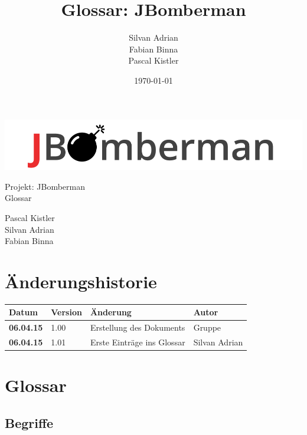 \documentclass[11pt]{scrartcl}
\title{Glossar: JBomberman}
\author{Silvan Adrian \\ Fabian Binna \\ Pascal Kistler}
\date{\today{}}
\begin{document}
\def\arraystretch{1.5}
\begin{titlepage}
\begin{center}
\vspace{10em}
\includegraphics[scale=2]{jbomberman}
\vspace{10em}
\end{center}
\begin{center}
\huge {Projekt: JBomberman} \\
\huge {Glossar}
\end{center}
\begin{center}
\vspace{10em}
\LARGE {Pascal Kistler} \\
\LARGE {Silvan Adrian} \\
\LARGE {Fabian Binna}
\end{center}

\end{titlepage}

\newpage
\section{Änderungshistorie}
\label{sec:Änderungen}

\begin{tabularx}{\linewidth}{l l l l}
\textbf{Datum} & \textbf{Version} & \textbf{Änderung}  & \textbf{Autor} \\
\hline
\textbf{06.04.15} & 1.00 & Erstellung des Dokuments & Gruppe \\
\textbf{06.04.15} & 1.01 & Erste Einträge ins Glossar & Silvan Adrian \\
\end{tabularx}

\newpage
\tableofcontents
\newpage
\section{Glossar}
\subsection{Begriffe}
\end{document}
